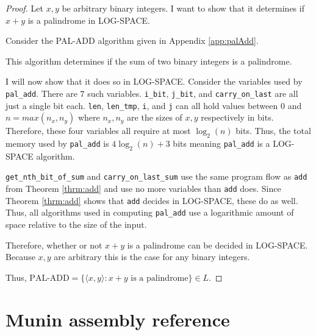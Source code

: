 \documentclass[11pt, a4paper]{article}
\begin{document}
\begin{proof}
    Let \(x, y\) be arbitrary binary integers.
    I want to show that it determines if \(x + y\) is a palindrome in LOG-SPACE.

    Consider the PAL-ADD algorithm given in Appendix \ref{app:palAdd}.

    This algorithm determines if the sum of two binary integers is a palindrome.

    I will now show that it does so in LOG-SPACE.
    Consider the variables used by \lstinline|pal_add|.
    There are \(7\) such variables.
    \lstinline|i_bit|, \lstinline|j_bit|, and \lstinline|carry_on_last| are all just a single bit each.
    \lstinline|len|, \lstinline|len_tmp|, \lstinline|i|, and \lstinline|j| can all hold values between \(0\) and \(n = max(n_x, n_y)\) where \(n_x, n_y\) are the sizes of \(x, y\) respectively in bits.
    Therefore, these four variables all require at most \(\log_2(n)\) bits.
    Thus, the total memory used by \lstinline|pal_add| is \(4\log_2(n) + 3\) bits meaning \lstinline|pal_add| is a LOG-SPACE algorithm.

    \lstinline|get_nth_bit_of_sum| and \lstinline|carry_on_last_sum| use the same program flow as \lstinline|add| from Theorem \ref{thrm:add} and use no more variables than \lstinline|add| does.
    Since Theorem \ref{thrm:add} shows that \lstinline|add| decides in LOG-SPACE, these do as well.
    Thus, all algorithms used in computing \lstinline|pal_add| use a logarithmic amount of space relative to the size of the input.

    Therefore, whether or not \(x + y\) is a palindrome can be decided in LOG-SPACE.
    Because \(x, y\) are arbitrary this is the case for any binary integers.
    
    Thus, \(\text{PAL-ADD} = \{\langle x, y \rangle : x + y \text{ is a palindrome}\} \in L\).
\end{proof}

\newpage

\section{Munin assembly reference}\label{app:asmRef}
\end{document}
